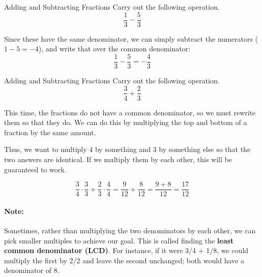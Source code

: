 \begin{example}{Adding and Subtracting Fractions}
Carry out the following operation.
\[\dfrac{1}{3} - \dfrac{5}{3}\]

\sol
Since these have the same denominator, we can simply subtract the numerators ($1-5 = -4$), and write that over the common denominator:
\[\dfrac{1}{3} - \dfrac{5}{3} = \boxed{-\dfrac{4}{3}}\]
\end{example}

\begin{example}{Adding and Subtracting Fractions}
Carry out the following operation.
\[\dfrac{3}{4} + \dfrac{2}{3}\]

\sol
This time, the fractions do not have a common denominator, so we must rewrite them so that they do.  We can do this by multiplying the top and bottom of a fraction by the same amount.

Thus, we want to multiply 4 by something and 3 by something else so that the two answers are identical.  If we multiply them by each other, this will be guaranteed to work.

\[\dfrac{3}{4} \cdot \dfrac{3}{3} + \dfrac{2}{3} \cdot \dfrac{4}{4} = \dfrac{9}{12} + \dfrac{8}{12} = \dfrac{9+8}{12} = \boxed{\dfrac{17}{12}}\]
\end{example}

\paragraph{Note:} Sometimes, rather than multiplying the two denominators by each other, we can pick smaller multiples to achieve our goal.  This is called finding the \textbf{least common denominator (LCD)}.  For instance, if it were 3/4 + 1/8, we could multiply the first by 2/2 and leave the second unchanged; both would have a denominator of 8.

